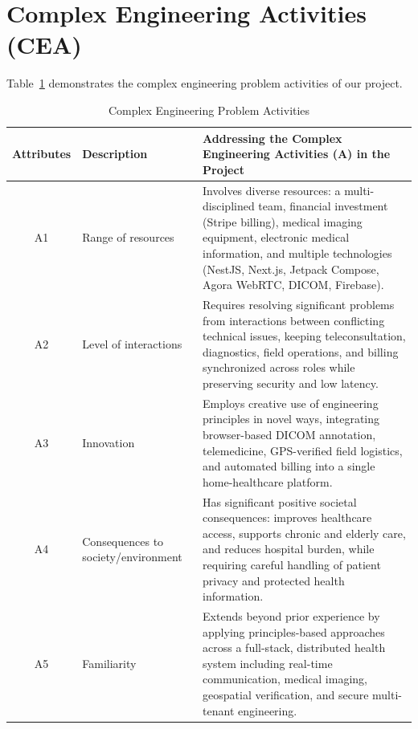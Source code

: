 \documentclass[lettersize,onecolumn,journal]{IEEEtran}
\begin{document}
\newpage

\section{Complex Engineering Activities (CEA)}

Table~\ref{tab:cea} demonstrates the complex engineering problem activities of our project.

\begin{table}[H]
\centering
\caption{Complex Engineering Problem Activities}
\begin{tabular}{|c|>{\raggedright\arraybackslash}m{4cm}|>{\raggedright\arraybackslash}m{8cm}|}
\hline
\textbf{Attributes} & \textbf{Description} & \textbf{Addressing the Complex Engineering Activities (A) in the Project} \\
\hline
A1 & Range of resources & Involves diverse resources: a multi-disciplined team, financial investment (Stripe billing), medical imaging equipment, electronic medical information, and multiple technologies (NestJS, Next.js, Jetpack Compose, Agora WebRTC, DICOM, Firebase). \\
\hline
A2 & Level of interactions & Requires resolving significant problems from interactions between conflicting technical issues, keeping teleconsultation, diagnostics, field operations, and billing synchronized across roles while preserving security and low latency. \\
\hline
A3 & Innovation & Employs creative use of engineering principles in novel ways, integrating browser-based DICOM annotation, telemedicine, GPS-verified field logistics, and automated billing into a single home-healthcare platform. \\
\hline
A4 & Consequences to society/environment & Has significant positive societal consequences: improves healthcare access, supports chronic and elderly care, and reduces hospital burden, while requiring careful handling of patient privacy and protected health information. \\
\hline
A5 & Familiarity & Extends beyond prior experience by applying principles-based approaches across a full-stack, distributed health system including real-time communication, medical imaging, geospatial verification, and secure multi-tenant engineering. \\
\hline
\end{tabular}
\label{tab:cea}
\end{table}
\end{document}
